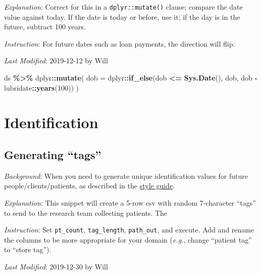 \documentclass[
]{book}
\newenvironment{Shaded}{\begin{snugshade}}{\end{snugshade}}
\newcommand{\DataTypeTok}[1]{\textcolor[rgb]{0.13,0.29,0.53}{#1}}
\newcommand{\DecValTok}[1]{\textcolor[rgb]{0.00,0.00,0.81}{#1}}
\newcommand{\KeywordTok}[1]{\textcolor[rgb]{0.13,0.29,0.53}{\textbf{#1}}}
\newcommand{\NormalTok}[1]{#1}
\newcommand{\OperatorTok}[1]{\textcolor[rgb]{0.81,0.36,0.00}{\textbf{#1}}}
\newcommand{\StringTok}[1]{\textcolor[rgb]{0.31,0.60,0.02}{#1}}
\begin{document}
\emph{Explanation}: Correct for this in a \texttt{dplyr::mutate()} clause; compare the date value against today. If the date is today or before, use it; if the day is in the future, subtract 100 years.

\emph{Instruction}: For future dates such as loan payments, the direction will flip.

\emph{Last Modified}: 2019-12-12 by Will

\begin{Shaded}
\begin{Highlighting}[]
\NormalTok{ ds }\OperatorTok{\%>\%}
\StringTok{ }\NormalTok{dplyr}\OperatorTok{::}\KeywordTok{mutate}\NormalTok{(}
    \DataTypeTok{dob =}\NormalTok{ dplyr}\OperatorTok{::}\KeywordTok{if\_else}\NormalTok{(dob }\OperatorTok{<=}\StringTok{ }\KeywordTok{Sys.Date}\NormalTok{(), dob, dob }\OperatorTok{{-}}\StringTok{ }\NormalTok{lubridate}\OperatorTok{::}\KeywordTok{years}\NormalTok{(}\DecValTok{100}\NormalTok{))}
\NormalTok{  )}
\end{Highlighting}
\end{Shaded}

\hypertarget{snippets-identification}{%
\section{Identification}\label{snippets-identification}}

\hypertarget{snippets-identification-tags}{%
\subsection{Generating ``tags''}\label{snippets-identification-tags}}

\emph{Background}: When you need to generate unique identification values for future people/clients/patients, as described in the \protect\hyperlink{style-number}{style guide}.

\emph{Explanation}: This snippet will create a 5-row csv with random 7-character ``tags'' to send to the research team collecting patients. The

\emph{Instruction}: Set \texttt{pt\_count}, \texttt{tag\_length}, \texttt{path\_out}, and execute. Add and rename the columns to be more appropriate for your domain (\emph{e.g.}, change ``patient tag'' to ``store tag'').

\emph{Last Modified}: 2019-12-30 by Will
\end{document}
